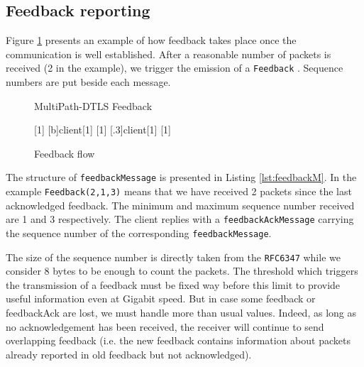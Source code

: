 \documentclass[11pt,a4paper,oldfontcommands]{memoir}
\begin{document}
\subsection{Feedback reporting}
\label{sec:feedbackReport}


Figure \ref{fig:feedback} presents an example of how feedback takes place once the communication is well established. After a reasonable number of packets is received (2 in the example), we trigger the emission of a \verb!Feedback! . Sequence numbers are put beside each message.


\begin{figure}[!h]
\centering
\begin{msc}[r]{MultiPath-DTLS Feedback}

\setlength{\instfootheight}{0em}
\setlength{\instheadheight}{0em}
\setlength{\instdist}{0.5\linewidth}
\setlength{\levelheight}{3em}


[1]
\nextlevel
{}[b]{}{client}[1]
\nextlevel
{}[1]
\nextlevel
{}[.3]{client}[1]
\nextlevel
{}[1]
\nextlevel

\end{msc}
\caption{Feedback flow}
\label{fig:feedback}
\end{figure}

The structure of \verb!feedbackMessage! is presented in Listing \ref{lst:feedbackM}. In the example \verb!Feedback(2,1,3)! means that we have received 2 packets since the last acknowledged feedback. The minimum and maximum sequence number received are 1 and 3 respectively. The client replies with a \verb!feedbackAckMessage! carrying the sequence number of the corresponding \verb!feedbackMessage!.

The size of the sequence number is directly taken from the \verb!RFC6347! while we consider 8 bytes to be enough to count the packets. The threshold which triggers the transmission of a feedback must be fixed way before this limit to provide useful information even at Gigabit speed. But in case some feedback or feedbackAck are lost, we must handle more than usual values. Indeed, as long as no acknowledgement has been received, the receiver will continue to send overlapping feedback (i.e. the new feedback contains information about packets already reported in old feedback but not acknowledged).
\end{document}
